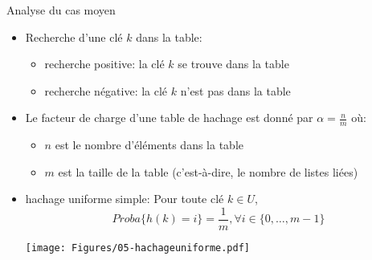 \begin{frame}{Analyse du cas moyen}


\begin{itemize}
\item Recherche d'une clé $k$ dans la table:
\begin{itemize}
\item recherche positive: la clé $k$ se trouve dans la table
\item recherche négative: la clé $k$ n'est pas dans la table
\end{itemize}
\medskip
\item Le \alert{facteur de charge} d'une table de hachage est donné par $\alpha=\frac{n}{m}$ où:
\begin{itemize}
\item $n$ est le nombre d'éléments dans la table
\item $m$ est la taille de la table (c'est-à-dire, le nombre de listes liées)
\end{itemize}
\medskip
\item \alert{hachage uniforme simple}: Pour toute clé $k\in U$,
$$Proba\{h(k)=i\}=\frac{1}{m}, \forall i\in\{0,\ldots,m-1\}$$

\bigskip

\centerline{\texttt{[image: Figures/05-hachageuniforme.pdf]}}

\end{itemize}

\end{frame}


